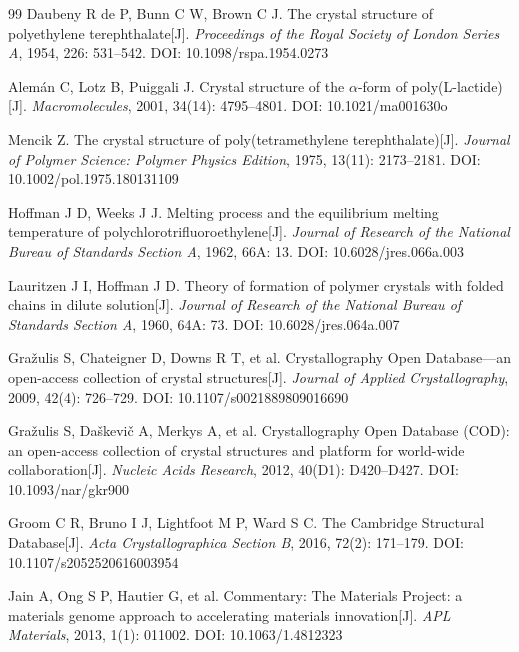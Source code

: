 \documentclass[11pt,a4paper]{ctexart}
\begin{document}
\begin{thebibliography}{99}
 Daubeny R de P, Bunn C W, Brown C J. The crystal structure of polyethylene terephthalate[J]. \textit{Proceedings of the Royal Society of London Series A}, 1954, 226: 531--542. DOI: 10.1098/rspa.1954.0273

 Alemán C, Lotz B, Puiggali J. Crystal structure of the $\alpha$-form of poly(L-lactide)[J]. \textit{Macromolecules}, 2001, 34(14): 4795--4801. DOI: 10.1021/ma001630o

 Mencik Z. The crystal structure of poly(tetramethylene terephthalate)[J]. \textit{Journal of Polymer Science: Polymer Physics Edition}, 1975, 13(11): 2173--2181. DOI: 10.1002/pol.1975.180131109

 Hoffman J D, Weeks J J. Melting process and the equilibrium melting temperature of polychlorotrifluoroethylene[J]. \textit{Journal of Research of the National Bureau of Standards Section A}, 1962, 66A: 13. DOI: 10.6028/jres.066a.003

 Lauritzen J I, Hoffman J D. Theory of formation of polymer crystals with folded chains in dilute solution[J]. \textit{Journal of Research of the National Bureau of Standards Section A}, 1960, 64A: 73. DOI: 10.6028/jres.064a.007

 Gražulis S, Chateigner D, Downs R T, et al. Crystallography Open Database---an open-access collection of crystal structures[J]. \textit{Journal of Applied Crystallography}, 2009, 42(4): 726--729. DOI: 10.1107/s0021889809016690

 Gražulis S, Daškevič A, Merkys A, et al. Crystallography Open Database (COD): an open-access collection of crystal structures and platform for world-wide collaboration[J]. \textit{Nucleic Acids Research}, 2012, 40(D1): D420--D427. DOI: 10.1093/nar/gkr900

 Groom C R, Bruno I J, Lightfoot M P, Ward S C. The Cambridge Structural Database[J]. \textit{Acta Crystallographica Section B}, 2016, 72(2): 171--179. DOI: 10.1107/s2052520616003954

 Jain A, Ong S P, Hautier G, et al. Commentary: The Materials Project: a materials genome approach to accelerating materials innovation[J]. \textit{APL Materials}, 2013, 1(1): 011002. DOI: 10.1063/1.4812323


\end{thebibliography}
\end{document}
